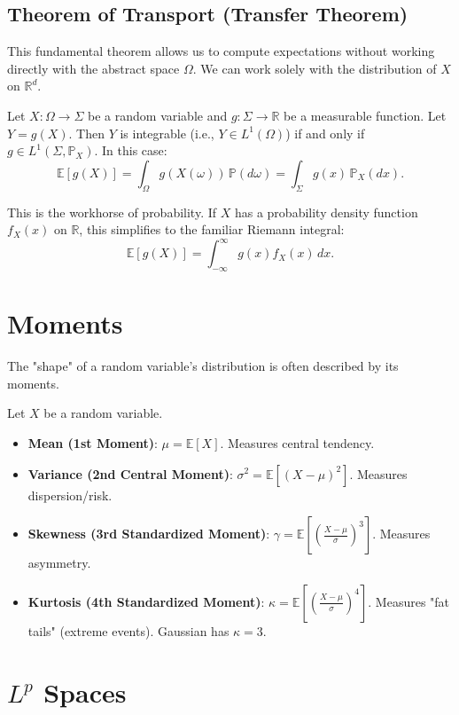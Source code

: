 \subsection{Theorem of Transport (Transfer Theorem)}
This fundamental theorem allows us to compute expectations without working directly with the abstract space $\Omega$. We can work solely with the distribution of $X$ on $\mathbb{R}^d$.

\begin{theorem}
Let $X: \Omega \to \Sigma$ be a random variable and $g: \Sigma \to \mathbb{R}$ be a measurable function. Let $Y = g(X)$. Then $Y$ is integrable (i.e., $Y \in L^1(\Omega)$) if and only if $g \in L^1(\Sigma, \mathbb{P}_X)$. In this case:
\[
\mathbb{E}[g(X)] = \int_{\Omega} g(X(\omega)) \, \mathbb{P}(d\omega) = \int_{\Sigma} g(x) \, \mathbb{P}_X(dx).
\]
\end{theorem}
This is the workhorse of probability. If $X$ has a probability density function $f_X(x)$ on $\mathbb{R}$, this simplifies to the familiar Riemann integral:
\[
\mathbb{E}[g(X)] = \int_{-\infty}^{\infty} g(x) f_X(x) \, dx.
\]

\section{Moments}
The "shape" of a random variable's distribution is often described by its moments.
\begin{definition}[Moments]
Let $X$ be a random variable.
\begin{itemize}
    \item \textbf{Mean (1st Moment)}: $\mu = \mathbb{E}[X]$. Measures central tendency.
    \item \textbf{Variance (2nd Central Moment)}: $\sigma^2 = \mathbb{E}[(X-\mu)^2]$. Measures dispersion/risk.
    \item \textbf{Skewness (3rd Standardized Moment)}: $\gamma = \mathbb{E}[(\frac{X-\mu}{\sigma})^3]$. Measures asymmetry.
    \item \textbf{Kurtosis (4th Standardized Moment)}: $\kappa = \mathbb{E}[(\frac{X-\mu}{\sigma})^4]$. Measures "fat tails" (extreme events). Gaussian has $\kappa=3$.
\end{itemize}
\end{definition}

\section{\texorpdfstring{$L^p$}{Lp} Spaces}

